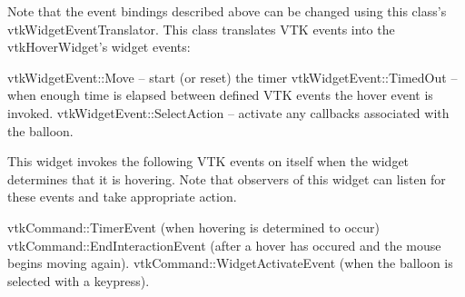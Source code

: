 Note that the event bindings described above can be changed using this class's vtk\-Widget\-Event\-Translator. This class translates V\-T\-K events into the vtk\-Hover\-Widget's widget events\-: 
\begin{DoxyPre}
   vtkWidgetEvent::Move -- start (or reset) the timer
   vtkWidgetEvent::TimedOut -- when enough time is elapsed between defined
                               VTK events the hover event is invoked.
   vtkWidgetEvent::SelectAction -- activate any callbacks associated 
                                   with the balloon.
 \end{DoxyPre}


This widget invokes the following V\-T\-K events on itself when the widget determines that it is hovering. Note that observers of this widget can listen for these events and take appropriate action. 
\begin{DoxyPre}
   vtkCommand::TimerEvent (when hovering is determined to occur)
   vtkCommand::EndInteractionEvent (after a hover has occured and the
                                    mouse begins moving again).
   vtkCommand::WidgetActivateEvent (when the balloon is selected with a
                                    keypress).
 \end{DoxyPre}


